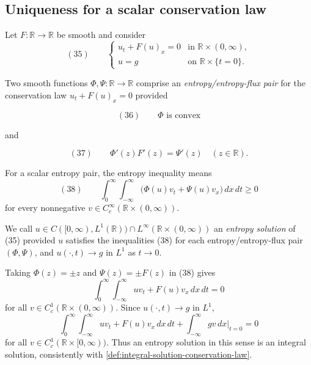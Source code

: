 \subsection{Uniqueness for a scalar conservation law}\label{sec:uniqueness-scalar-conservation-law-entropy}

Let $F:\mathbb R\to\mathbb R$ be smooth and consider
\[
(35)\qquad
\begin{cases}
u_t+F(u)_x=0 & \text{in }\mathbb R\times(0,\infty),\\
u=g & \text{on }\mathbb R\times\{t=0\}.
\end{cases}
\]

\begin{definition}
\label{def:entropy-entropy-flux-pair-scalar}
Two smooth functions $\Phi,\Psi:\mathbb{R}\to\mathbb{R}$ comprise an \textit{entropy/entropy-flux pair} for the conservation law $u_t + F(u)_x = 0$ provided

$$(36) \qquad \Phi \text{ is convex}$$

and

$$(37) \qquad \Phi'(z)F'(z) = \Psi'(z) \quad (z\in\mathbb{R}).$$
\end{definition}

For a scalar entropy pair, the entropy inequality means
\[
(38)\qquad
\int_0^\infty\!\int_{-\infty}^{\infty}
\bigl(\Phi(u)v_t+\Psi(u)v_x\bigr)\,dx\,dt\geq0
\]
for every nonnegative $v\in C_c^\infty(\mathbb R\times(0,\infty))$.

\begin{definition}
\label{def:entropy-solution-scalar-new}
We call $u\in C([0,\infty), L^1(\mathbb{R}))\cap L^\infty(\mathbb{R}\times(0,\infty))$ an \textit{entropy solution} of (35) provided $u$ satisfies the inequalities (38) for each entropy/entropy-flux pair $(\Phi,\Psi)$, and $u(\cdot,t)\to g$ in $L^1$ as $t\to 0$.
\end{definition}

\begin{remark}
\label{rem:entropy-solution-scalar-consistency}
Taking $\Phi(z)=\pm z$ and $\Psi(z)=\pm F(z)$ in (38) gives
$$\int_0^\infty\int_{-\infty}^\infty uv_t + F(u)v_x\,dx\,dt = 0$$
for all $v\in C_c^1(\mathbb{R}\times(0,\infty))$. Since $u(\cdot,t)\to g$ in $L^1$,
$$\int_0^\infty\int_{-\infty}^\infty uv_t + F(u)v_x\,dx\,dt + \int_{-\infty}^\infty gv\,dx\Big|_{t=0} = 0$$
for all $v\in C_c^1(\mathbb{R}\times[0,\infty))$. Thus an entropy solution in this sense is an integral solution, consistently with \cref{def:integral-solution-conservation-law}.
\end{remark}

